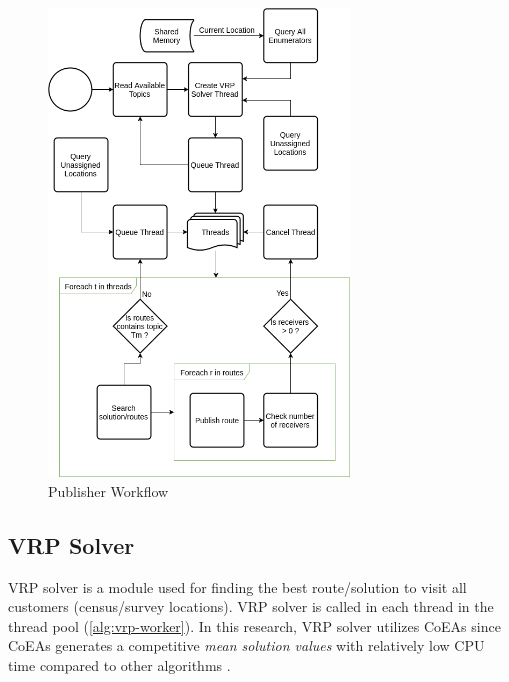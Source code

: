 \documentclass[conference]{IEEEtran}
\begin{document}
\begin{figure}[!]
	\centering
	\includegraphics[width=8cm]{Resources/Images/publisher-algorithm}
	\caption{Publisher Workflow}
	\label{fig:publisher-algorithm}
\end{figure} 


\subsection{VRP Solver}
\label{ssec:vrp-solver}
VRP solver is a module used for finding the best route/solution to visit all customers (census/survey locations). VRP solver is called in each thread in the thread pool (\autoref{alg:vrp-worker}). In this research, VRP solver utilizes CoEAs since CoEAs generates a competitive \textit{mean solution values} with relatively low CPU time compared to other algorithms \cite{de_oliveira_cooperative_2016}. 
\end{document}

